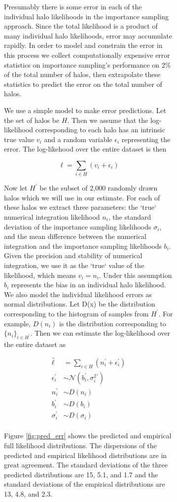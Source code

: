 \documentclass[\docopts]{\docclass}
\begin{document}
\begin{figure}[h!]
\begin{figure}[h!]
Presumably there is some error in each of the individual halo likelihoods in the importance sampling approach. Since the total likelihood is a product of many individual halo likelihoods, error may accumulate rapidly. In order to model and constrain the error in this process we collect computationally expensive error statistics on importance sampling's performance on 2\% of the total number of halos, then extrapolate these statistics to predict the error on the total number of halos.

We use a simple model to make error predictions. Let the set of halos be $H$. Then we assume that the log-likelihood corresponding to each halo has an intrinsic true value $v_i$ and a random variable $\epsilon_i$ representing the error. The log-likehood over the entire dataset is then

$$\ell = \sum_{i\in H}\left(v_i + \epsilon_i \right)$$

Now let $H^\prime$ be the subset of 2,000 randomly drawn halos which we will use in our estimate. For each of these halos we extract three parameters: the `true` numerical integration likelihood $n_i$, the standard deviation of the importance sampling likelihoods $\sigma_i$, and the mean difference between the numerical integration and the importance sampling likelihoods $b_i$. Given the precision and stability of numerical integration, we use it as the `true` value of the likelihood, which means $v_i = n_i$. Under this assumption $b_i$ represents the bias in an individual halo likelihood. We also model the individual likelihood errors as normal distributions. Let D(x) be the distribution corresponding to the histogram of samples from $H^\prime$. For example, $D(n_i)$ is the distribution corresponding to $\{n_i\}_{i\in H^\prime}$. Then we can estimate the log-likelihood over the entire dataset as

\begin{align*}
\hat{\ell} &= \sum_{i\in H}\left(n_i^\prime + \epsilon_i^\prime \right)\\
\epsilon_i^\prime &\sim \mathcal{N}(b_i^\prime, \sigma_i^2^\prime)\\
n_i^\prime &\sim D(n_i)\\
b_i^\prime &\sim D(b_i)\\
\sigma_i^\prime &\sim D(\sigma_i)\\
\end{align*}

\noindent Figure \ref{fig:pred_err} shows the predicted and empirical full likelihood distributions. The dispersions of the predicted and empirical likelihood distributions are in great agreement. The standard deviations of the three predicted distributions are 15, 5.1, and 1.7 and the standard deviations of the empirical distributions are 13, 4.8, and 2.3. 


\end{figure}
\end{figure}
\end{document}
